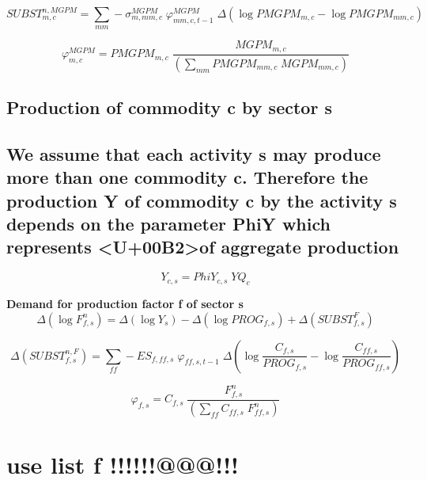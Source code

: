 \documentclass[12pt]{article}
\numberwithin{equation}{section}
\begin{document}
\begin{dmath}
SUBST^{n,MGPM}_{m, c} = \sum_{mm} -\sigma^{MGPM}_{m, mm, c} \; \varphi^{MGPM}_{mm, c, t-1} \; \varDelta \left(\operatorname{log} PMGPM_{m, c} - \operatorname{log} PMGPM_{mm, c}\right)
\end{dmath}

\begin{dmath}
\varphi^{MGPM}_{m, c} = PMGPM_{m, c} \; \frac{MGPM_{m, c}}{\left( \sum_{mm} PMGPM_{mm, c} \; MGPM_{mm, c} \right)}
\end{dmath}



\subsection{Production of commodity c by sector s}




\subsection{We assume that each activity s may produce more than one commodity c. Therefore the  production Y of commodity c by the activity s depends on the parameter PhiY which represents <U+00B2>of aggregate production}


\begin{dmath}
Y_{c, s} = PhiY_{c, s} \; YQ_{c}
\end{dmath}


\textbf{Demand for production factor f of sector s}
\begin{dmath}
\varDelta \left(\operatorname{log} F^{n}_{f, s}\right) = \varDelta \left(\operatorname{log} Y_{s}\right) - \varDelta \left(\operatorname{log} PROG_{f, s}\right) + \varDelta \left(SUBST^{F}_{f, s}\right)
\end{dmath}

\begin{dmath}
\varDelta \left(SUBST^{n,F}_{f, s}\right) = \sum_{ff} -ES_{f, ff, s} \; \varphi_{ff, s, t-1} \; \varDelta \left(\operatorname{log} \frac{C_{f, s}}{PROG_{f, s}} - \operatorname{log} \frac{C_{ff, s}}{PROG_{ff, s}}\right)
\end{dmath}

\begin{dmath}
\varphi_{f, s} = C_{f, s} \; \frac{F^{n}_{f, s}}{\left( \sum_{ff} C_{ff, s} \; F^{n}_{ff, s} \right)}
\end{dmath}




\section{use list f !!!!!!@@@!!!}
\end{document}
